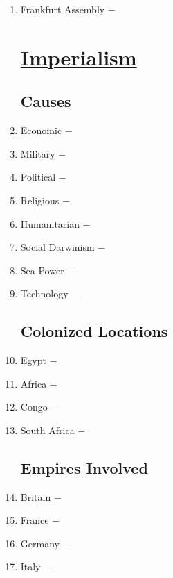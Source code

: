 \documentclass[12pt]{article}
\begin{document}
\begin{enumerate}
\item Frankfurt Assembly $-$ 

\section{\underline{Imperialism}}

\subsection{Causes}

\item Economic $-$ 

\item Military $-$ 

\item Political $-$ 

\item Religious $-$ 

\item Humanitarian $-$ 

\item Social Darwinism $-$ 

\item Sea Power $-$ 

\item Technology $-$ 

\subsection{Colonized Locations}

\item Egypt $-$

\item Africa $-$ 

\item Congo $-$ 

\item South Africa $-$ 

\subsection{Empires Involved}

\item Britain $-$ 

\item France $-$ 

\item Germany $-$ 

\item Italy $-$ 


\end{enumerate}
\end{document}
